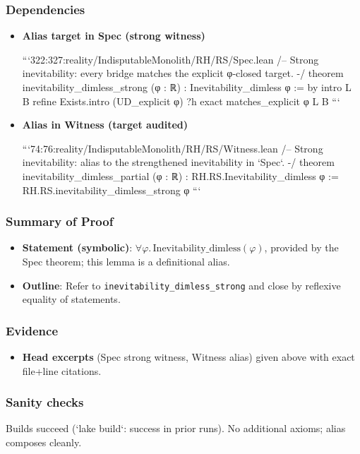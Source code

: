 \documentclass{article}
\begin{document}
\subsubsection{Dependencies}
\begin{itemize}[leftmargin=*]
  \item \textbf{Alias target in Spec (strong witness)}

```322:327:reality/IndisputableMonolith/RH/RS/Spec.lean
/-- Strong inevitability: every bridge matches the explicit φ‑closed target. -/
 theorem inevitability_dimless_strong (φ : ℝ) : Inevitability_dimless φ := by
  intro L B
  refine Exists.intro (UD_explicit φ) ?h
  exact matches_explicit φ L B
```

  \item \textbf{Alias in Witness (target audited)}

```74:76:reality/IndisputableMonolith/RH/RS/Witness.lean
/-- Strong inevitability: alias to the strengthened inevitability in `Spec`. -/
 theorem inevitability_dimless_partial (φ : ℝ) : RH.RS.Inevitability_dimless φ :=
  RH.RS.inevitability_dimless_strong φ
```
\end{itemize}

\subsubsection{Summary of Proof}
\begin{itemize}[leftmargin=*]
  \item \textbf{Statement (symbolic)}: \(\forall φ.\,\mathrm{Inevitability\_dimless}(φ)\), provided by the Spec theorem; this lemma is a definitional alias.
  \item \textbf{Outline}: Refer to \texttt{inevitability\_dimless\_strong} and close by reflexive equality of statements.
\end{itemize}

\subsubsection{Evidence}
\begin{itemize}[leftmargin=*]
  \item \textbf{Head excerpts} (Spec strong witness, Witness alias) given above with exact file+line citations.
\end{itemize}

\subsubsection{Sanity checks}
Builds succeed (`lake build`: success in prior runs). No additional axioms; alias composes cleanly.
\end{document}
